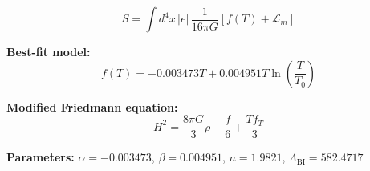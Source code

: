 
\begin{equation}
  S = \int d^4x \, |e| \, \frac{1}{16\pi G} \left[ f(T) + \mathcal{L}_m \right]
\end{equation}

\textbf{Best-fit model:}
\begin{equation}
  f(T) = -0.003473 T + 0.004951 T \ln\!\left(\frac{T}{T_0}\right)
\end{equation}

\textbf{Modified Friedmann equation:}
\begin{equation}
  H^2 = \frac{8\pi G}{3} \rho - \frac{f}{6} + \frac{T f_T}{3}
\end{equation}

\textbf{Parameters:}
$\alpha = -0.003473$, \quad
$\beta = 0.004951$, \quad
$n = 1.9821$, \quad
$\Lambda_{\text{BI}} = 582.4717$